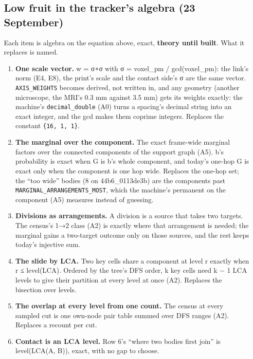 \subsection{\texorpdfstring{Low fruit in the tracker's algebra (23 September)}{Low fruit in the tracker's algebra (23 September)}}

Each item is algebra on the equation above, exact, \textbf{theory until built}. What it replaces is named.

\begin{enumerate}
\item \textbf{One scale vector.} w = σ∘σ with σ = voxel\_\allowbreak{}pm / gcd(voxel\_\allowbreak{}pm): the link's norm (E4, E8), the print's scale and the contact side's σ are the same vector. \texttt{AXIS\_\allowbreak{}WEIGHTS} becomes derived, not written in, and any geometry (another microscope, the MRI's 0.3 mm against 3.5 mm) gets its weights exactly: the machine's \texttt{decimal\_\allowbreak{}double} (A0) turns a spacing's decimal string into an exact integer, and the gcd makes them coprime integers. Replaces the constant \texttt{\{16, 1, 1\}}.
\item \textbf{The marginal over the component.} The exact frame-wide marginal factors over the connected components of the support graph (A5). b's probability is exact when G is b's whole component, and today's one-hop G is exact only when the component is one hop wide. Replaces the one-hop set; the “too wide” bodies (8 on 44b6\_\allowbreak{}0113de3b) are the components past \texttt{MARGINAL\_\allowbreak{}ARRANGEMENTS\_\allowbreak{}MOST}, which the machine's permanent on the component (A5) measures instead of guessing.
\item \textbf{Divisions as arrangements.} A division is a source that takes two targets. The census's 1→2 class (A2) is exactly where that arrangement is needed; the marginal gains a two-target outcome only on those sources, and the rest keeps today's injective sum.
\item \textbf{The slide by LCA.} Two key cells share a component at level r exactly when r ≤ level(LCA). Ordered by the tree's DFS order, k key cells need k − 1 LCA levels to give their partition at every level at once (A2). Replaces the bisection over levels.
\item \textbf{The overlap at every level from one count.} The census at every sampled cut is one own-node pair table summed over DFS ranges (A2). Replaces a recount per cut.
\item \textbf{Contact is an LCA level.} Row 6's “where two bodies first join” is level(LCA(A, B)), exact, with no gap to choose.
\end{enumerate}

